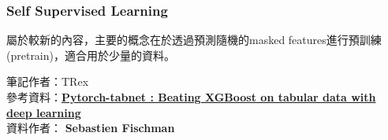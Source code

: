 \documentclass[12pt]{ctexart}
\begin{document}
\subsubsection{Self Supervised Learning}
屬於較新的內容，主要的概念在於透過預測隨機的masked features進行預訓練(pretrain)，適合用於少量的資料。

\begin{tcolorbox}
筆記作者：TRex \\ 
參考資料：\href{https://www.youtube.com/live/ysBaZO8YmX8?si=Esm2Al5lFKWaihMh}{\textbf{Pytorch-tabnet : Beating XGBoost on tabular data with deep learning}} \\ 
資料作者： \textbf{Sebastien Fischman}
\end{tcolorbox}
\end{document}
